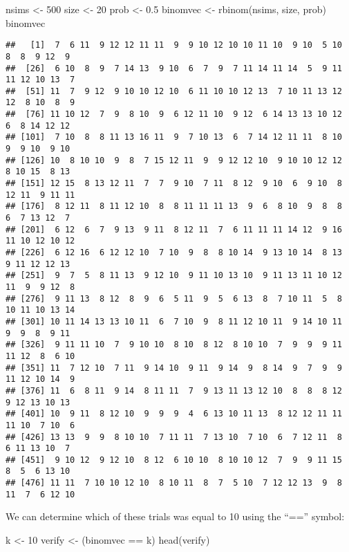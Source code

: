 \documentclass[
]{book}
\newenvironment{Shaded}{\begin{snugshade}}{\end{snugshade}}
\newcommand{\DecValTok}[1]{\textcolor[rgb]{0.00,0.00,0.81}{#1}}
\newcommand{\FloatTok}[1]{\textcolor[rgb]{0.00,0.00,0.81}{#1}}
\newcommand{\FunctionTok}[1]{\textcolor[rgb]{0.00,0.00,0.00}{#1}}
\newcommand{\NormalTok}[1]{#1}
\newcommand{\OtherTok}[1]{\textcolor[rgb]{0.56,0.35,0.01}{#1}}
\newcommand{\SpecialCharTok}[1]{\textcolor[rgb]{0.00,0.00,0.00}{#1}}
\begin{document}
\begin{Shaded}
\begin{Highlighting}[]
\NormalTok{nsims }\OtherTok{\textless{}{-}} \DecValTok{500}
\NormalTok{size }\OtherTok{\textless{}{-}} \DecValTok{20}
\NormalTok{prob }\OtherTok{\textless{}{-}} \FloatTok{0.5}
\NormalTok{binomvec }\OtherTok{\textless{}{-}} \FunctionTok{rbinom}\NormalTok{(nsims, size, prob)}
\NormalTok{binomvec}
\end{Highlighting}
\end{Shaded}

\begin{verbatim}
##   [1]  7  6 11  9 12 12 11 11  9  9 10 12 10 10 11 10  9 10  5 10  8  8  9 12  9
##  [26]  6 10  8  9  7 14 13  9 10  6  7  9  7 11 14 11 14  5  9 11 11 12 10 13  7
##  [51] 11  7  9 12  9 10 10 12 10  6 11 10 10 12 13  7 10 11 13 12 12  8 10  8  9
##  [76] 11 10 12  7  9  8 10  9  6 12 11 10  9 12  6 14 13 13 10 12  6  8 14 12 12
## [101]  7 10  8  8 11 13 16 11  9  7 10 13  6  7 14 12 11 11  8 10  9  9 10  9 10
## [126] 10  8 10 10  9  8  7 15 12 11  9  9 12 12 10  9 10 10 12 12  8 10 15  8 13
## [151] 12 15  8 13 12 11  7  7  9 10  7 11  8 12  9 10  6  9 10  8 12 11  9 11 11
## [176]  8 12 11  8 11 12 10  8  8 11 11 11 13  9  6  8 10  9  8  8  6  7 13 12  7
## [201]  6 12  6  7  9 13  9 11  8 12 11  7  6 11 11 11 14 12  9 16 11 10 12 10 12
## [226]  6 12 16  6 12 12 10  7 10  9  8  8 10 14  9 13 10 14  8 13  9 11 12 12 13
## [251]  9  7  5  8 11 13  9 12 10  9 11 10 13 10  9 11 13 11 10 12 11  9  9 12  8
## [276]  9 11 13  8 12  8  9  6  5 11  9  5  6 13  8  7 10 11  5  8 10 11 10 13 14
## [301] 10 11 14 13 13 10 11  6  7 10  9  8 11 12 10 11  9 14 10 11  9  9  8  9 11
## [326]  9 11 11 10  7  9 10 10  8 10  8 12  8 10 10  7  9  9  9 11 11 12  8  6 10
## [351] 11  7 12 10  7 11  9 14 10  9 11  9 14  9  8 14  9  7  9  9 11 12 10 14  9
## [376] 11  6  8 11  9 14  8 11 11  7  9 13 11 13 12 10  8  8  8 12  9 12 13 10 13
## [401] 10  9 11  8 12 10  9  9  9  4  6 13 10 11 13  8 12 12 11 11 11 10  7 10  6
## [426] 13 13  9  9  8 10 10  7 11 11  7 13 10  7 10  6  7 12 11  8  6 11 13 10  7
## [451]  9 10 12  9 12 10  8 12  6 10 10  8 10 10 12  7  9  9 11 15  8  5  6 13 10
## [476] 11 11  7 10 10 12 10  8 10 11  8  7  5 10  7 12 12 13  9  8 11  7  6 12 10
\end{verbatim}

We can determine which of these trials was equal to 10 using the ``=='' symbol:

\begin{Shaded}
\begin{Highlighting}[]
\NormalTok{k }\OtherTok{\textless{}{-}} \DecValTok{10}
\NormalTok{verify }\OtherTok{\textless{}{-}}\NormalTok{ (binomvec }\SpecialCharTok{==}\NormalTok{ k)}
\FunctionTok{head}\NormalTok{(verify)}
\end{Highlighting}
\end{Shaded}
\end{document}
